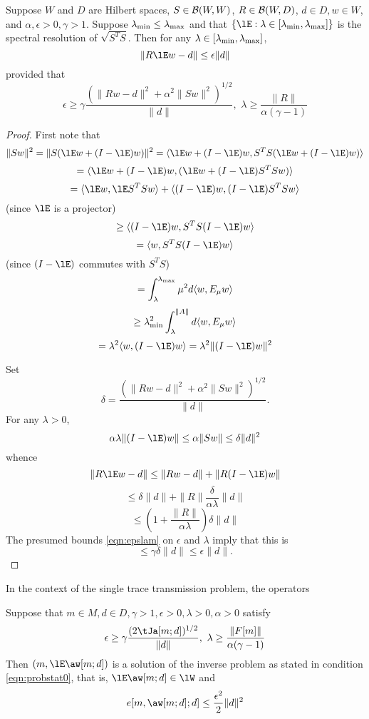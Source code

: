 \begin{theorem}
  \label{thm:minsol}
  Suppose $W$ and $D$ are Hilbert spaces, $S \in {\cal B}(W,W)$, $R
  \in {\cal B}(W,D)$, $d \in D, w \in W$, and $\alpha, \epsilon>0, \gamma >
  1$. Suppose $\lambda_{\rm min} \le \lambda_{\rm max}$ and that
  $\{\lE: \lambda \in [\lambda_{\rm min},\lambda_{\rm max}]\}$ is the
  spectral resolution of $\sqrt{S^TS}$. Then for any $\lambda \in  [\lambda_{\rm min},\lambda_{\rm max}]$,
  \begin{equation}
    \label{eqn:gentol}
    \|R\lE w-d\| \le \epsilon\|d\|
  \end{equation}
  provided that 
  \begin{equation}
    \label{eqn:epslam}
    \epsilon \ge \gamma \frac{(\|Rw-d\|^2 +
      \alpha^2\|Sw\|^2)^{1/2}}{\|d\|}, \,\,\lambda \ge 
    \frac{\|R\|}{\alpha (\gamma-1)}
  \end{equation}
\end{theorem}
\begin{proof}
First note that
\[
  \|Sw\|^2 = \|S(\lE w + (I-\lE)w)\|^2 =
  \langle \lE w + (I-\lE)w, S^TS (\lE w + (I-\lE)w)\rangle
\]
\[
  =  \langle \lE w + (I-\lE)w, (\lE w + (I-\lE) S^TS w)\rangle
\]
\[
  = \langle \lE w,\lE S^TSw \rangle+ \langle(I-\lE)w,(I-\lE) S^TS w\rangle
\]
(since $\lE$ is a projector)
\[
\ge  \langle (I-\lE)w,S^TS (I-\lE)w \rangle
\]
\[
  =\langle w, S^TS (I-\lE)w\rangle
\]
(since $(I-\lE)$ commutes with $S^TS$)
\[
  =\int_{\lambda}^{\lambda_{\rm max}} \mu^2 d\langle w,E_{\mu}w\rangle 
\]
\[
  \ge \lambda_{\rm min}^2 \int_{\lambda}^{\|A\|} d\langle w,E_{\mu}w\rangle
\]
\begin{equation}
  \label{eqn:lb}
  =\lambda^2\langle w, (I-\lE)w\rangle   =\lambda^2\|(I-\lE)w\|^2
\end{equation}

Set
\[
  \delta =  \frac{(\|Rw-d\|^2+\alpha^2\|Sw\|^2)^{1/2}}{\|d\|}.
\]
For any $\lambda >0$,
\[
  \alpha \lambda \|(I-\lE)w\| \le \alpha \|Sw\| \le \delta \|d\|^2
\]
whence
\[
  \|R\lE w-d\| \le \|Rw-d\|+\|R(I-\lE)w\|
\]
\[
  \le \delta\|d\| + \|R\|\frac{\delta}{\alpha \lambda}\|d\|
\]
\[
  \le \left(1 + \frac{\|R\|}{\alpha\lambda}\right)\delta\|d\|
\]
The presumed bounds \ref{eqn:epslam} on $\epsilon$ and $\lambda$ imply that this is
\[
  \le \gamma \delta \|d\| \le \epsilon\|d\|.
\]
\end{proof}

In the context of the single trace transmission problem, the operators

\begin{corollary}
  Suppose that $m \in M, d\in D, \gamma>1, \epsilon>0, \lambda >0, \alpha
  > 0$ satisfy
    \begin{equation}
    \label{eqn:epslam}
    \epsilon \ge \gamma \frac{(2\tJa[m;d])^{1/2}}{\|d\|}, \,\,\lambda \ge 
    \frac{\|F[m]\|}{\alpha (\gamma-1)}
  \end{equation}
  Then $(m,\lE \aw[m;d])$ is a solution of the inverse problem as stated
  in condition \ref{eqn:probstat0}, that is, $\lE\aw[m;d] \in \lW$ and
  \[
    e[m,\aw[m;d];d] \le \frac{\epsilon^2}{2} \|d\|^2
  \]
\end{corollary}

